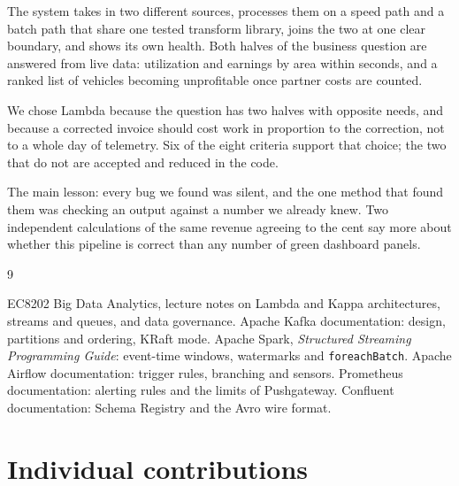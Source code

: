 \documentclass[11pt,a4paper]{article}
\begin{document}
The system takes in two different sources, processes them on a speed path and a batch
path that share one tested transform library, joins the two at one clear boundary,
and shows its own health. Both halves of the business question are answered from live
data: utilization and earnings by area within seconds, and a ranked list of vehicles
becoming unprofitable once partner costs are counted.

We chose Lambda because the question has two halves with opposite needs, and because a
corrected invoice should cost work in proportion to the correction, not to a whole day
of telemetry. Six of the eight criteria support that choice; the two that do not are
accepted and reduced in the code.

The main lesson: every bug we found was silent, and the one method that found them
was checking an output against a number we already knew. Two independent calculations
of the same revenue agreeing to the cent say more about whether this pipeline is
correct than any number of green dashboard panels.

\begin{thebibliography}{9}
 EC8202 Big Data Analytics, lecture notes on Lambda and Kappa
architectures, streams and queues, and data governance.
 Apache Kafka documentation: design, partitions and ordering, KRaft mode.
 Apache Spark, \emph{Structured Streaming Programming Guide}: event-time
windows, watermarks and \texttt{foreachBatch}.
 Apache Airflow documentation: trigger rules, branching and sensors.
 Prometheus documentation: alerting rules and the limits of Pushgateway.
 Confluent documentation: Schema Registry and the Avro wire format.
\end{thebibliography}

\clearpage
\appendix
\section{Individual contributions}
\end{document}
